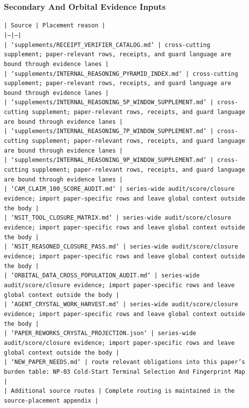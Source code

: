 \documentclass[11pt]{article}
\begin{document}
\subsubsection*{Secondary And Orbital Evidence Inputs}

\noindent\texttt{| Source | Placement reason |}\\
\noindent\texttt{|---|---|}\\
\noindent\texttt{| `supplements/RECEIPT\_VERIFIER\_CATALOG.md` | cross-cutting supplement; paper-relevant rows, receipts, and guard language are bound through evidence lanes |}\\
\noindent\texttt{| `supplements/INTERNAL\_REASONING\_PYRAMID\_INDEX.md` | cross-cutting supplement; paper-relevant rows, receipts, and guard language are bound through evidence lanes |}\\
\noindent\texttt{| `supplements/INTERNAL\_REASONING\_5P\_WINDOW\_SUPPLEMENT.md` | cross-cutting supplement; paper-relevant rows, receipts, and guard language are bound through evidence lanes |}\\
\noindent\texttt{| `supplements/INTERNAL\_REASONING\_7P\_WINDOW\_SUPPLEMENT.md` | cross-cutting supplement; paper-relevant rows, receipts, and guard language are bound through evidence lanes |}\\
\noindent\texttt{| `supplements/INTERNAL\_REASONING\_9P\_WINDOW\_SUPPLEMENT.md` | cross-cutting supplement; paper-relevant rows, receipts, and guard language are bound through evidence lanes |}\\
\noindent\texttt{| `CAM\_CLAIM\_100\_SCORE\_AUDIT.md` | series-wide audit/score/closure evidence; import paper-specific rows and leave global context outside the body |}\\
\noindent\texttt{| `NSIT\_TOOL\_CLOSURE\_MATRIX.md` | series-wide audit/score/closure evidence; import paper-specific rows and leave global context outside the body |}\\
\noindent\texttt{| `NSIT\_REASONED\_CLOSURE\_PASS.md` | series-wide audit/score/closure evidence; import paper-specific rows and leave global context outside the body |}\\
\noindent\texttt{| `ORBITAL\_DATA\_CROSS\_POPULATION\_AUDIT.md` | series-wide audit/score/closure evidence; import paper-specific rows and leave global context outside the body |}\\
\noindent\texttt{| `AGENT\_CRYSTAL\_WORK\_HARVEST.md` | series-wide audit/score/closure evidence; import paper-specific rows and leave global context outside the body |}\\
\noindent\texttt{| `PAPER\_REWORKS\_CRYSTAL\_PROJECTION.json` | series-wide audit/score/closure evidence; import paper-specific rows and leave global context outside the body |}\\
\noindent\texttt{| `NEW\_PAPER\_NEEDS.md` | route relevant obligations into this paper's burden table: NP-03 Cold-Start Terminal Selection And Fingerprint Map |}\\
\noindent\texttt{| Additional source routes | Complete routing is maintained in the source-placement appendix |}\\
\end{document}
